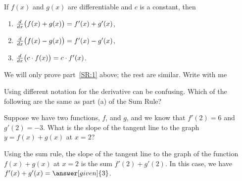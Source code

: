 \documentclass{ximera}
\begin{document}
\begin{theorem}\label{theorem:sum rule}
If $f(x)$ and $g(x)$ are differentiable and $c$ is a constant, then 
\begin{enumerate}
\item\label{SR:1} $\frac{d}{\mathop{}\!d x} \big( f(x) + g(x)\big) = f'(x) + g'(x)$,
\item $\frac{d}{\mathop{}\!d x} \big( f(x) - g(x)\big) = f'(x) - g'(x)$,
\item $\frac{d}{\mathop{}\!d x} \big(c\cdot f(x)\big) = c\cdot f'(x)$.
\end{enumerate}

\begin{explanation}
We will only prove part~\ref{SR:1} above; the rest are similar. Write with me
\begin{image}
\end{image}
\end{explanation}
\end{theorem}

\begin{question}
  Using different notation for the derivative can be confusing.  Which of the
  following are the same as part (a) of the Sum Rule?
  \begin{selectAll}
  \end{selectAll}
\end{question}


\begin{example}
  Suppose we have two functions, $f$, and $g$, and we know that $f'(2) = 6$ and $g'(2) = -3$.
  What is the slope of the tangent line to the graph $y=f(x) + g(x)$ at $x = 2$?
  \begin{explanation}
  	Using the sum rule, the slope of the tangent line to the graph of the function $f(x) + g(x)$ at $x = 2$ is the sum $f'(2) + g'(2)$.   In 
	this case, we have $f'(x) + g'(x) = \answer[given]{3}$.
  \end{explanation}
\end{example} 
\end{document}
